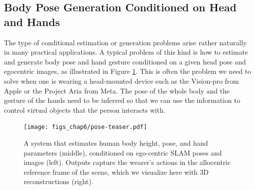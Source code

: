 \documentclass[../../book-main.tex]{subfiles}
\begin{document}
\subsection{Body Pose Generation Conditioned on Head and Hands}\label{sub:ego-allo}
The type of
conditional estimation or generation problems arise rather naturally in many
practical applications. 
A typical problem of this kind is how to estimate and generate body pose and hand gesture conditioned on a given head pose and egocentric images, as illustrated in Figure \ref{fig:pose-teaser}. This is often the problem we need to solve when one is wearing a head-mounted device such as the Vision-pro from Apple or the Project Aria from Meta. The pose of the whole body and the gesture of the hands need to be inferred so that we can use the information to control virtual objects that the person interacts with.
\begin{figure}[t]
  \centering
  \texttt{[image: figs\_chap6/pose-teaser.pdf]}
    \caption{
A system that estimates human body height, pose,  and hand parameters (middle), conditioned on ego-centric SLAM poses and images (left). Outputs capture the wearer's actions in the allocentric reference frame of the scene, which we visualize here with 3D reconstructions (right).
  }
  \label{fig:pose-teaser}

\end{figure}
\end{document}
